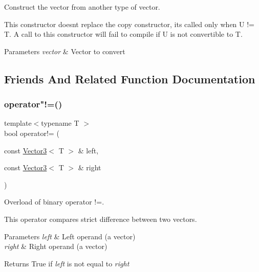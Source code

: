 Construct the vector from another type of vector. 

This constructor doesn\textquotesingle{}t replace the copy constructor, it\textquotesingle{}s called only when U != T. A call to this constructor will fail to compile if U is not convertible to T.


\begin{DoxyParams}{Parameters}
{\em vector} & Vector to convert \\
\hline
\end{DoxyParams}


\subsection{Friends And Related Function Documentation}
\mbox{\label{classsf_1_1_vector3_a608500d1ad3b78082cb5bb4356742bd4}} 
\subsubsection{\texorpdfstring{operator"!=()}{operator!=()}}
{\footnotesize\ttfamily template$<$typename T $>$ \\
bool operator!= (\begin{DoxyParamCaption}\item[{const \hyperlink{classsf_1_1_vector3}{Vector3}$<$ T $>$ \&}]{left,  }\item[{const \hyperlink{classsf_1_1_vector3}{Vector3}$<$ T $>$ \&}]{right }\end{DoxyParamCaption})\hspace{0.3cm}{\ttfamily [related]}}



Overload of binary operator !=. 

This operator compares strict difference between two vectors.


\begin{DoxyParams}{Parameters}
{\em left} & Left operand (a vector) \\
\hline
{\em right} & Right operand (a vector)\\
\hline
\end{DoxyParams}
\begin{DoxyReturn}{Returns}
True if {\itshape left} is not equal to {\itshape right} 
\end{DoxyReturn}
\mbox{\label{classsf_1_1_vector3_a44ec312b31c1a85dcff4863795f98329}} 
